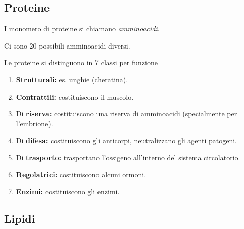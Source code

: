 \documentclass[a4paper]{article}
\begin{document}

\pagebreak

\subsection{Proteine}

I monomero di proteine si chiamano \textit{amminoacidi}.


Ci sono 20 possibili amminoacidi diversi.



Le proteine si distinguono in 7 classi per funzione
\begin{enumerate}
    \item \textbf{Strutturali:} es. unghie (cheratina).

    \item \textbf{Contrattili:} costituiscono il muscolo.

    \item Di \textbf{riserva:} costituiscono una riserva di amminoacidi (specialmente per l'embrione).

    \item Di \textbf{difesa:} costituiscono gli anticorpi, neutralizzano gli agenti patogeni.
    
    \item Di \textbf{trasporto:} trasportano l'ossigeno all'interno del sistema circolatorio.

    \item \textbf{Regolatrici:} costituiscono alcuni ormoni.

    \item \textbf{Enzimi:} costituiscono gli enzimi.
\end{enumerate}

\pagebreak

\subsection{Lipidi}

\end{document}
